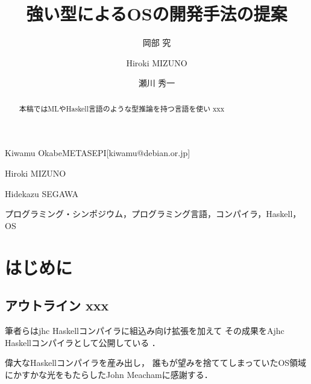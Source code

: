 \documentclass[submit,techreq,noauthor]{ipsj}
\begin{document}
\title{強い型によるOSの開発手法の提案}


\author{岡部 究}{Kiwamu Okabe}{METASEPI}[kiwamu@debian.or.jp]
\author{Hiroki MIZUNO}{Hiroki MIZUNO}{}
\author{瀬川 秀一}{Hidekazu SEGAWA}{}

\begin{abstract}
本稿ではMLやHaskell言語のような型推論を持つ言語を使い xxx
\end{abstract}

\begin{jkeyword}
プログラミング・シンポジウム，プログラミング言語，コンパイラ，Haskell，OS
\end{jkeyword}

\maketitle

\section{はじめに}

\subsection{アウトライン xxx}

筆者らはjhc Haskellコンパイラに組込み向け拡張を加えて \cite{j-ikamusume5}
その成果をAjhc Haskellコンパイラとして公開している \cite{ajhc} ．

\begin{acknowledgment}
偉大なHaskellコンパイラを産み出し，
誰もが望みを捨ててしまっていたOS領域にかすかな光をもたらしたJohn Meachamに感謝する．
\end{acknowledgment}




\begin{biography}
\end{biography}
\end{document}
